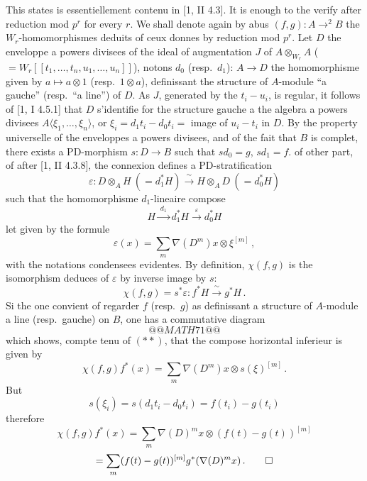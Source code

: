 \documentclass[12pt,a4paper]{article}
\theoremstyle{plain}
\theoremstyle{definition}
\theoremstyle{remark}
\begin{document}
This states is essentiellement contenu in [1, II 4.3]. It is enough to the verify after reduction mod $p^r$ for every $r$. We shall denote again by abus $(f,g) : A \to^2 B$ the $W_r$-homomorphismes deduits of ceux donnes by reduction mod $p^r$. Let $D$ the enveloppe a powers divisees of the ideal of augmentation $J$ of $A \otimes_{W_r} A$ ($= W_r[[t_1, \ldots, t_n, u_1, \ldots, u_n]]$), notons $d_0$ (resp.\ $d_1$): $A \to D$ the homomorphisme given by $a \mapsto a \otimes 1$ (resp.\ $1 \otimes a$), definissant the structure of $A$-module ``a gauche'' (resp.\ ``a line'') of $D$. As $J$, generated by the $t_i - u_i$, is regular, it follows of [1, I 4.5.1] that $D$ s'identifie for the structure gauche a the algebra a powers divisees $A\langle \xi_1, \ldots, \xi_n \rangle$, or $\xi_i = d_1t_i - d_0t_i =$ image of $u_i - t_i$ in $D$. By the property universelle of the enveloppes a powers divisees, and of the fait that $B$ is complet, there exists a PD-morphism $s : D \to B$ such that $sd_0 = g$, $sd_1 = f$. of other part, of after [1, II 4.3.8], the connexion defines a PD-stratification
\[
\varepsilon : D \otimes_A H\ (= d_1^*H) \xrightarrow{\;\sim\;} H \otimes_A D\ (= d_0^*H)
\]
such that the homomorphisme $d_1$-lineaire compose
\[
H \xrightarrow{\;d_1\;} d_1^*H \xrightarrow{\;\varepsilon\;} d_0^*H
\]
let given by the formule
\begin{equation}\tag{$**$}
\varepsilon(x) = \sum_m \nabla(D^m)x \otimes \xi^{[m]}\,,
\end{equation}
with the notations condensees evidentes. By definition, $\chi(f,g)$ is the isomorphism deduces of $\varepsilon$ by inverse image by $s$:
\[
\chi(f,g) = s^*\varepsilon : f^*H \xrightarrow{\;\sim\;} g^*H\,.
\]
Si the one convient of regarder $f$ (resp.\ $g$) as definissant a structure of $A$-module a line (resp.\ gauche) on $B$, one has a commutative diagram
\[
@@MATH71@@
\]
which shows, compte tenu of $(**)$, that the compose horizontal inferieur is given by
\[
\chi(f,g)f^*(x) = \sum_m \nabla(D^m)x \otimes s(\xi)^{[m]}\,.
\]
But
\[
s(\xi_i) = s(d_1t_i - d_0t_i) = f(t_i) - g(t_i)
\]
therefore
\[
\chi(f,g)f^*(x) = \sum_m \nabla(D)^m x \otimes (f(t)-g(t))^{[m]}
\]
\[
= \sum_m (f(t)-g(t))^{[m]} g^*(\nabla(D)^m x)\,.\qedhere
\]

\subsubsection{}
\end{document}
